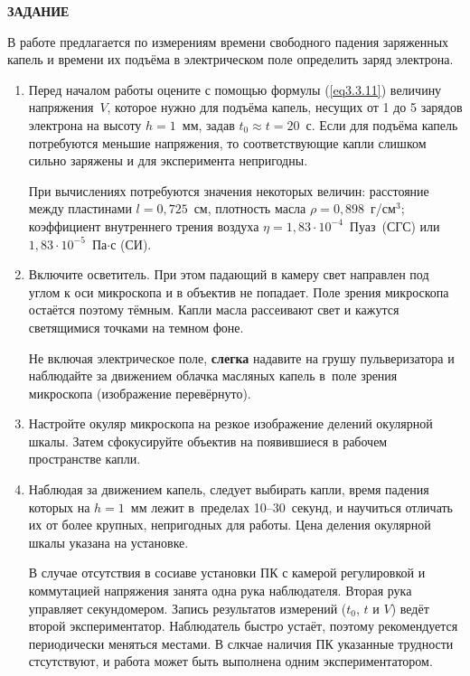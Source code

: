 {\Large \bf ЗАДАНИЕ}

В работе предлагается по измерениям времени свободного падения заряженных капель и времени их подъёма в электрическом поле определить заряд электрона.

\begin{enumerate}

\item{Перед началом работы оцените с помощью формулы (\ref{eq3.3.11}) величину напряжения~$V$, которое нужно для подъёма капель, несущих от 1 до 5 зарядов электрона на высоту $h=1$~мм, задав $t_0\approx t=20$~с. Если для подъёма капель потребуются меньшие напряжения, то соответствующие капли слишком сильно заряжены и для эксперимента непригодны.

При вычислениях потребуются значения некоторых величин: расстояние между пластинами $l=0,725$~см, плотность масла
$\rho=0,898$~г/см$^3$; коэффициент внутреннего трения воздуха $\eta=1,83\cdot 10^{-4}$~Пуаз~(СГС) или $1,83\cdot 10^{-5}$~Па$\cdot$с
(СИ).}

\item{ Включите осветитель. При этом падающий в камеру свет направлен под углом к оси микроскопа и в объектив не попадает. Поле зрения микроскопа остаётся поэтому тёмным. Капли масла рассеивают свет и кажутся светящимися точками на темном фоне.

Не включая электрическое поле, {\bf слегка} надавите на грушу пульверизатора  и наблюдайте за движением облачка масляных капель в~поле зрения микроскопа (изображение перевёрнуто).}

\item{ Настройте окуляр микроскопа на резкое изображение делений окулярной шкалы. Затем сфокусируйте объектив на появившиеся в рабочем пространстве капли.}

\item{ Наблюдая за движением капель, следует выбирать капли, время падения которых на $h=1$~мм лежит в~пределах
10--30~секунд, и научиться отличать их от более крупных, непригодных для работы. Цена деления окулярной шкалы указана на установке.

В случае отсутствия в сосиаве установки ПК с камерой регулировкой и коммутацией напряжения занята одна рука наблюдателя. Вторая рука управляет секундомером. Запись результатов измерений ($t_0$, $t$ и $V$) ведёт второй экспериментатор. Наблюдатель быстро устаёт, поэтому рекомендуется периодически меняться местами. В слкчае наличия ПК указанные трудности стсутствуют, и работа может быть выполнена одним экспериментатором.

}
\end{enumerate}
